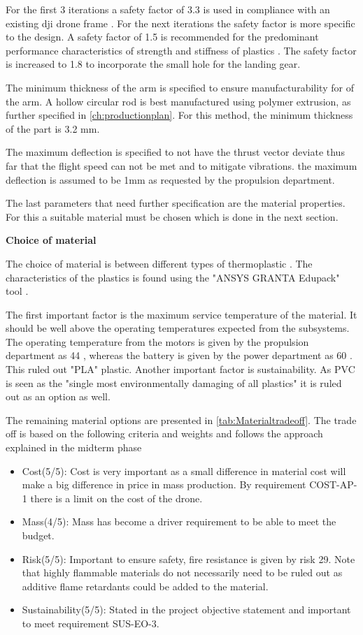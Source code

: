 For the first 3 iterations a safety factor of 3.3 is used in compliance with an existing dji drone frame \cite{ks3.3}. For the next iterations the safety factor is more specific to the design. A safety factor of 1.5 is recommended for the predominant performance characteristics of strength and stiffness of plastics \cite{ks}. The safety factor is increased to 1.8 to incorporate the small hole for the landing gear. 

The minimum thickness of the arm is specified to ensure manufacturability for of the arm. A hollow circular rod is best manufactured using polymer extrusion, as further specified in \autoref{ch:productionplan}. For this method, the minimum thickness of the part is 3.2 mm\cite{ppThickness}.

The maximum deflection is specified to not have the thrust vector deviate thus far that the flight speed can not be met and to mitigate vibrations. the maximum deflection is assumed to be 1mm as requested by the propulsion department.

The last parameters that need further specification are the material properties. For this a suitable material must be chosen which is done in the next section.

\textbf{Choice of material} 

The choice of material is between different types of thermoplastic \cite{midterm}. The characteristics of the plastics is found using the  "ANSYS GRANTA Edupack" tool \cite{materialbible} .

The first important factor is the maximum service temperature of the material. It should be well above the operating temperatures expected from the subsystems. The operating temperature from the motors is given by the propulsion department as 44 \celsius, whereas the battery is given by the power department as 60 \celsius. This ruled out "PLA" plastic. Another important factor is sustainability. As PVC is seen as the "single most environmentally damaging of all plastics" \cite{pvcgreen} it is ruled out as an option as well. 

The remaining material options are presented in \autoref{tab:Materialtradeoff}.
The trade off is based on the following criteria and weights and follows the approach explained in the midterm phase \cite{midterm}
\begin{itemize}[noitemsep,nolistsep]
    \item Cost(5/5): Cost is very important as a small difference in material cost will make a big difference in price in mass production. By requirement COST-AP-1 there is a limit on the cost of the drone.
    \item Mass(4/5): Mass has become a driver requirement to be able to meet the budget.
    \item Risk(5/5): Important to ensure safety, fire resistance is given by risk 29. Note that highly flammable materials do not necessarily need to be ruled out as additive flame retardants could be added to the material.
    \item Sustainability(5/5): Stated in the project objective statement and important to meet requirement SUS-EO-3.
\end{itemize}

